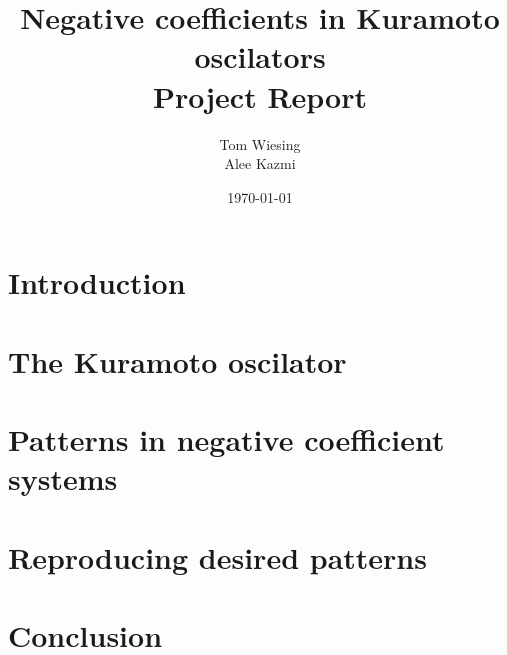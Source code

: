\documentclass[12pt]{article}
\title{Negative coefficients in Kuramoto oscilators \\ Project Report}
\author{Tom Wiesing \\ Alee Kazmi}
\date{\today}
\begin{document}
	
	\maketitle
	\newpage
	
	\tableofcontents
	\newpage
	
	\section{Introduction}
	
	\newpage
	
	\section{The Kuramoto oscilator}
	
	\newpage
	
	\section{Patterns in negative coefficient systems}
	
	\newpage
	
	\section{Reproducing desired patterns}
	
	\newpage
	
	\section{Conclusion}
	
	
	\printbibliography
\end{document}
